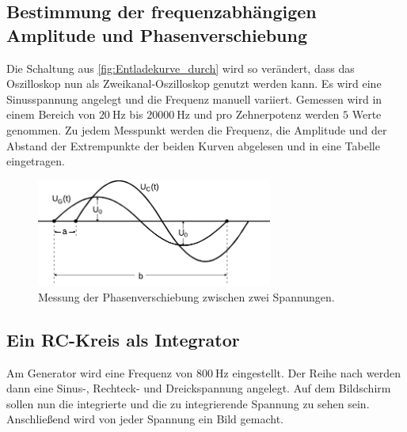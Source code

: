 \subsection{Bestimmung der frequenzabhängigen Amplitude und Phasenverschiebung} %
\label{sub:Freque_A&P_durch}
\noindent Die Schaltung aus \autoref{fig:Entladekurve_durch} wird so verändert, dass das Oszilloskop nun als Zweikanal-Oszilloskop genutzt werden kann.
Es wird eine Sinusspannung angelegt und die Frequenz manuell variiert.
Gemessen wird in einem Bereich von $\qty{20}{\hertz}$ bis $\qty{20000}{\hertz}$ und pro Zehnerpotenz werden $5$ Werte genommen.
Zu jedem Messpunkt werden die Frequenz, die Amplitude und der Abstand der Extrempunkte der beiden Kurven abgelesen und in eine Tabelle eingetragen.
\begin{figure}[H]
    \centering
    \includegraphics[width=0.69\textwidth]{build/Abb_7_edit.pdf}
    \caption {Messung der Phasenverschiebung zwischen zwei Spannungen.\cite{V353}}
    \label{fig:Freque_A&P_durch}
\end{figure}
\subsection{Ein RC-Kreis als Integrator} %
\label{sub:Integrator_durch}
Am Generator wird eine Frequenz von $\qty{800}{\hertz}$ eingestellt.
Der Reihe nach werden dann eine Sinus-, Rechteck- und Dreickspannung angelegt.
Auf dem Bildschirm sollen nun die integrierte und die zu integrierende Spannung zu sehen sein.
Anschließend wird von jeder Spannung ein Bild gemacht.

